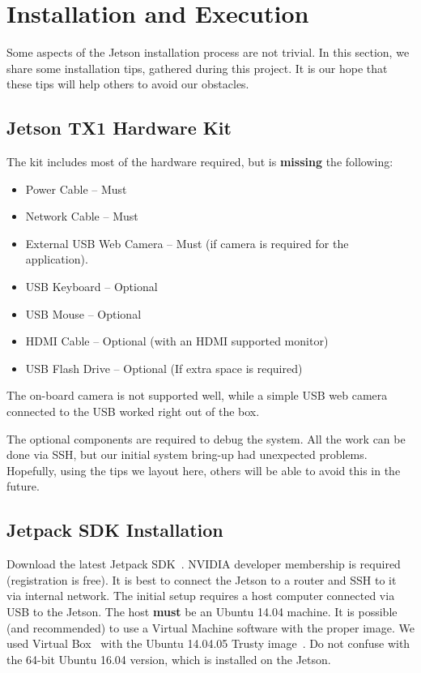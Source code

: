 \section{Installation and Execution}
\label{sec:installation}
Some aspects of the Jetson installation process are not trivial. In this section, we share some installation tips, gathered during this project. It is our hope that these tips will help others to avoid our obstacles.

\subsection{Jetson TX1 Hardware Kit}
The kit includes most of the hardware required, but is \textbf{missing} the following:
\begin{itemize}
\item Power Cable -- Must
\item Network Cable -- Must
\item External USB Web Camera -- Must (if camera is required for the application). \item USB Keyboard -- Optional
\item USB Mouse -- Optional
\item HDMI Cable -- Optional (with an HDMI supported monitor)
\item USB Flash Drive -- Optional (If extra space is required)
\end{itemize}

The on-board camera is not supported well, while a simple USB web camera connected to the USB worked right out of the box.

The optional components are required to debug the system. All the work can be done via SSH, but our initial system bring-up had unexpected problems. Hopefully, using the tips we layout here, others will be able to avoid this in the future.

\subsection{Jetpack SDK Installation}
Download the latest Jetpack SDK~\cite{jetpackinstall}. NVIDIA developer membership is required (registration is free).
It is best to connect the Jetson to a router and SSH to it via internal network. The initial setup requires a host computer connected via USB to the Jetson. The host \textbf{must} be an Ubuntu 14.04 machine. It is possible (and recommended) to use a Virtual Machine software with the proper image. We used Virtual Box~\cite{virtualboxinstall} with the Ubuntu 14.04.05 Trusty image~\cite{virtualboxubuntuimage}. Do not confuse with the 64-bit Ubuntu 16.04 version, which is installed on the Jetson.

